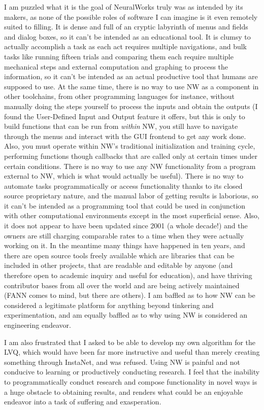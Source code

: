 \documentclass[12pt]{article}
\begin{document}
I am puzzled what it is the goal of NeuralWorks truly was as intended by its makers, as none of the possible roles of software I can imagine is it even remotely suited to filling.  It is dense and full of an cryptic labyrinth of menus and fields and dialog boxes, so it can't be intended as an educational tool.  It is clumsy to actually accomplish a task as each act requires multiple navigations, and bulk tasks like running fifteen trials and comparing them each require multiple mechanical steps and external computation and graphing to process the information, so it can't be intended as an actual productive tool that humans are supposed to use.  At the same time, there is no way to use NW as a component in other toolchains, from other programming languages for instance, without manually doing the steps yourself to process the inputs and obtain the outputs (I found the User-Defined Input and Output feature it offers, but this is only to build functions that can be run from \emph{within} NW, you still have to navigate through the menus and interact with the GUI frontend to get any work done.  Also, you must operate within NW's traditional initialization and training cycle, performing functions though callbacks that are called only at certain times under certain conditions.  There is no way to use any NW functionality from a program external to NW, which is what would actually be useful).  There is no way to automate tasks programmatically or access functionality thanks to its closed source proprietary nature, and the manual labor of getting results is laborious, so it can't be intended as a programming tool that could be used in conjunction with other computational environments except in the most superficial sense.  Also, it does not appear to have been updated since 2001 (a whole decade!) and the owners are still charging comparable rates to a time when they were actually working on it.  In the meantime many things have happened in ten years, and there are open source tools freely available which are libraries that can be included in other projects, that are readable and editable by anyone (and therefore open to academic inquiry and useful for education), and have thriving contributor bases from all over the world and are being actively maintained (FANN comes to mind, but there are others).  I am baffled as to how NW can be considered a legitimate platform for anything beyond tinkering and experimentation, and am equally baffled as to why using NW is considered an engineering endeavor.  

I am also frustrated that I asked to be able to develop my own algorithm for the LVQ, which would have been far more instructive and useful than merely creating something through InstaNet, and was refused.  Using NW is painful and not conducive to learning or productively conducting research.  I feel that the inability to programmatically conduct research and compose functionality in novel ways is a huge obstacle to obtaining results, and renders what could be an enjoyable endeavor into a task of suffering and exasperation.  
\end{document}
